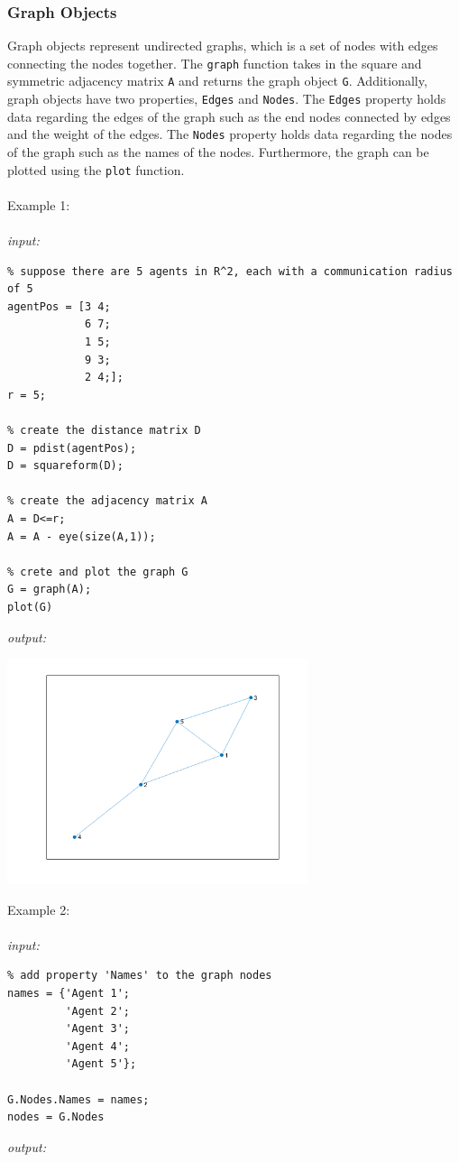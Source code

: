 \documentclass[../MATLAB_Primer.tex]{subfiles}
\begin{document}
\subsubsection{Graph Objects}
Graph objects represent undirected graphs, which is a set of nodes with edges connecting the nodes together. The \texttt{graph} function takes in the square and symmetric adjacency matrix \texttt{A} and returns the graph object \texttt{G}. Additionally, graph objects have two properties, \texttt{Edges} and \texttt{Nodes}. The \texttt{Edges} property holds data regarding the edges of the graph such as the end nodes connected by edges and the weight of the edges. The \texttt{Nodes} property holds data regarding the nodes of the graph such as the names of the nodes. Furthermore, the graph can be plotted using the \texttt{plot} function.
\\ \\
Example 1:
\\ \\
\textit{input:}
\begin{lstlisting}
% suppose there are 5 agents in R^2, each with a communication radius of 5
agentPos = [3 4;
            6 7;
            1 5;
            9 3;
            2 4;];
r = 5;

% create the distance matrix D
D = pdist(agentPos);
D = squareform(D);

% create the adjacency matrix A
A = D<=r;
A = A - eye(size(A,1));

% crete and plot the graph G
G = graph(A);
plot(G)
\end{lstlisting}
\textit{output:}
\begin{center}
    \includegraphics[width=250pt]{images/graph_output.png}
\end{center}

Example 2:
\\ \\
\textit{input:}
\begin{lstlisting}
% add property 'Names' to the graph nodes
names = {'Agent 1'; 
         'Agent 2'; 
         'Agent 3'; 
         'Agent 4'; 
         'Agent 5'};
         
G.Nodes.Names = names;
nodes = G.Nodes

\end{lstlisting}
\textit{output:}
\end{document}
